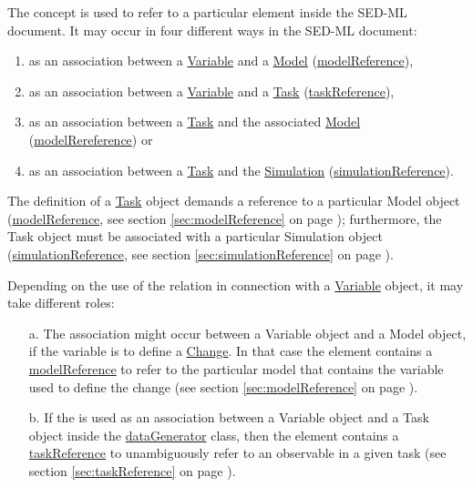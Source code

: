 \label{sec:reference}

The  concept is used to refer to a particular element inside the SED-ML document. It may occur in four different ways in the SED-ML document:
%
\begin{enumerate}
\item{as an association between a \hyperref[class:variable]{Variable} and a \hyperref[class:model]{Model} (\hyperref[sec:modelReference]{modelReference}),}
\item{as an association between a \hyperref[class:variable]{Variable} and a \hyperref[class:task]{Task} (\hyperref[sec:taskReference]{taskReference}),}
\item{as an association between a \hyperref[class:task]{Task} and the associated \hyperref[class:model]{Model} (\hyperref[sec:modelReference]{modelRereference}) or}
\item{as an association between a \hyperref[class:task]{Task} and the \hyperref[class:simulation]{Simulation} (\hyperref[sec:simulationReference]{simulationReference}).}
\end{enumerate}
%
The definition of a \hyperref[class:task]{Task} object demands a reference to a particular Model object (\hyperref[sec:modelReference]{modelReference}, see section \ref{sec:modelReference} on page \pageref{sec:modelReference}); furthermore, the Task object must be associated with a particular Simulation object (\hyperref[sec:simulationReference]{simulationReference}, see section \ref{sec:simulationReference} on page \pageref{sec:simulationReference}).

Depending on the use of the  relation in connection with a \hyperref[class:variable]{Variable} object, it may take different roles: 
\begin{enumerate}
\item[a.]{The  association might occur between a Variable object and a Model object, if the variable is to define a \hyperref[class:change]{Change}. 
In that case the  element contains a \hyperref[sec:modelReference]{modelReference} to refer to the particular model that contains the variable used to define the change (see section \ref{sec:modelReference} on page \pageref{sec:modelReference}). }
\item[b.]{If the  is used as an association between a Variable object and a Task object  inside the \hyperref[class:dataGenerator]{dataGenerator} class, then the  element contains a \hyperref[sec:taskReference]{taskReference} to unambiguously refer to an observable in a given task (see section \ref{sec:taskReference} on page \pageref{sec:taskReference}).}
\end{enumerate}



